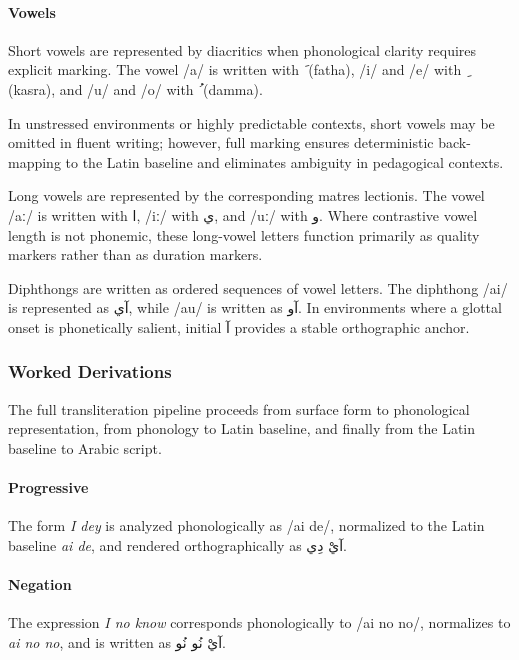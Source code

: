 \documentclass[12pt]{article}
\newcommand{\AR}[1]{\foreignlanguage{arabic}{#1}}
\begin{document}
\paragraph{Vowels}

Short vowels are represented by diacritics when phonological clarity requires explicit marking. The vowel /a/ is written with \AR{َ} (fatha), /i/ and /e/ with \AR{ِ} (kasra), and /u/ and /o/ with \AR{ُ} (damma). 

In unstressed environments or highly predictable contexts, short vowels may be omitted in fluent writing; however, full marking ensures deterministic back-mapping to the Latin baseline and eliminates ambiguity in pedagogical contexts.

Long vowels are represented by the corresponding matres lectionis. The vowel /aː/ is written with \AR{ا}, /iː/ with \AR{ي}, and /uː/ with \AR{و}. Where contrastive vowel length is not phonemic, these long-vowel letters function primarily as quality markers rather than as duration markers.

Diphthongs are written as ordered sequences of vowel letters. The diphthong /ai/ is represented as \AR{آي}, while /au/ is written as \AR{آو}. In environments where a glottal onset is phonetically salient, initial \AR{آ} provides a stable orthographic anchor.

\subsubsection{Worked Derivations}

The full transliteration pipeline proceeds from surface form to phonological representation, from phonology to Latin baseline, and finally from the Latin baseline to Arabic script.

\paragraph{Progressive}

The form \textit{I dey} is analyzed phonologically as /ai de/, normalized to the Latin baseline \textit{ai de}, and rendered orthographically as \AR{آيْ دِي}.

\paragraph{Negation}

The expression \textit{I no know} corresponds phonologically to /ai no no/, normalizes to \textit{ai no no}, and is written as \AR{آيْ نُو نُو}.
\end{document}
